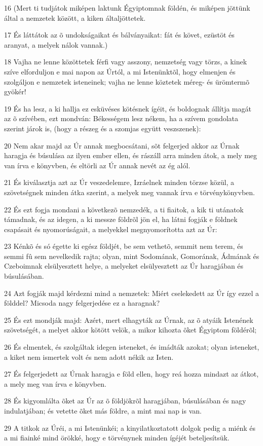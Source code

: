 \par 16 (Mert ti tudjátok miképen laktunk Égyiptomnak földén, és miképen jöttünk által a nemzetek között, a kiken általjöttetek.
\par 17 És láttátok az õ undokságaikat és bálványaikat: fát és követ, ezüstöt és aranyat, a melyek nálok vannak.)
\par 18 Vajha ne lenne közöttetek férfi vagy asszony, nemzetség vagy törzs, a kinek szíve elforduljon e mai napon az Úrtól, a mi Istenünktõl, hogy elmenjen és szolgáljon e nemzetek isteneinek; vajha ne lenne köztetek méreg- és ürömtermõ gyökér!
\par 19 És ha lesz, a ki hallja ez esküvéses kötésnek ígéit, és boldognak állítja magát az õ szívében, ezt mondván: Békességem lesz nékem, ha a szívem gondolata szerint járok is, (hogy a részeg és a szomjas együtt veszszenek):
\par 20 Nem akar majd az Úr annak megbocsátani, sõt felgerjed akkor az Úrnak haragja és búsulása az ilyen ember ellen, és rászáll arra minden átok, a mely meg van írva e könyvben, és eltörli az Úr annak nevét az ég alól.
\par 21 És kiválasztja azt az Úr veszedelemre, Izráelnek minden törzse közül, a szövetségnek minden átka szerint, a melyek meg vannak írva e törvénykönyvben.
\par 22 És ezt fogja mondani a következõ nemzedék, a ti fiaitok, a kik ti utánatok támadnak, és az idegen, a ki messze földrõl jön el, ha látni fogják e földnek csapásait és nyomorúságait, a melyekkel megnyomorította azt az Úr:
\par 23 Kénkõ és só égette ki egész földjét, be sem vethetõ, semmit nem terem, és semmi fû sem nevelkedik rajta; olyan, mint Sodomának, Gomorának, Ádmának és Czeboimnak elsülyesztett helye, a melyeket elsülyesztett az Úr haragjában és búsulásában.
\par 24 Azt fogják majd kérdezni mind a nemzetek: Miért cselekedett az Úr így ezzel a földdel? Micsoda nagy felgerjedése ez a haragnak?
\par 25 És ezt mondják majd: Azért, mert elhagyták az Úrnak, az õ atyáik Istenének szövetségét, a melyet akkor kötött velök, a mikor kihozta õket Égyiptom földérõl;
\par 26 És elmentek, és szolgáltak idegen isteneket, és imádták azokat; olyan isteneket, a kiket nem ismertek volt és nem adott nékik az Isten.
\par 27 És felgerjedett az Úrnak haragja e föld ellen, hogy reá hozza mindazt az átkot, a mely meg van írva e könyvben.
\par 28 És kigyomlálta õket az Úr az õ földjökrõl haragjában, búsulásában és nagy indulatjában; és vetette õket más földre, a mint mai nap is van.
\par 29 A titkok az Úréi, a mi Istenünkéi; a kinyilatkoztatott dolgok pedig a miénk és a mi fiainké mind örökké, hogy e törvénynek minden ígéjét beteljesítsük.

